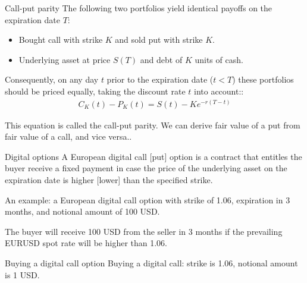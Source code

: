 \documentclass{beamer}
\begin{document}
\begin{frame}{Call-put parity}
\justify
The following two portfolios yield identical payoffs on the expiration date $T$:
\begin{itemize}
\justifying
\item Bought call with strike $K$ and sold put with strike $K$.
\item Underlying asset at price $S(T)$ and debt of $K$ units of cash.
\end{itemize}

\justify
Consequently, on any day $t$ prior to the expiration date ($t<T$) these portfolios should be priced equally, taking the discount rate $t$ into account::
\begin{align*}
C_K(t) - P_K(t) = S(t) - Ke^{-r(T-t)}
\end{align*}

\justify
This equation is called the \alert{call-put parity}. We can derive fair value of a put from fair value of a call, and vice versa..
\end{frame}



\begin{frame}{Digital options}
\justify
A European \alert{digital call [put]} option is a contract that entitles the buyer receive a fixed payment in case the price of the underlying asset on the expiration date is higher [lower] than the specified strike.

\justify
An example: a European digital call option with strike of 1.06, expiration in 3 months, and notional amount of 100 USD. 

\justify
The buyer will receive 100 USD from the seller in 3 months if the prevailing EURUSD spot rate will be higher than 1.06.
\end{frame}



\begin{frame}{Buying a digital call option}
\justifying
Buying a digital call: strike is 1.06, notional amount is 1 USD.

\justifying
\centering
\end{frame}
\end{document}

